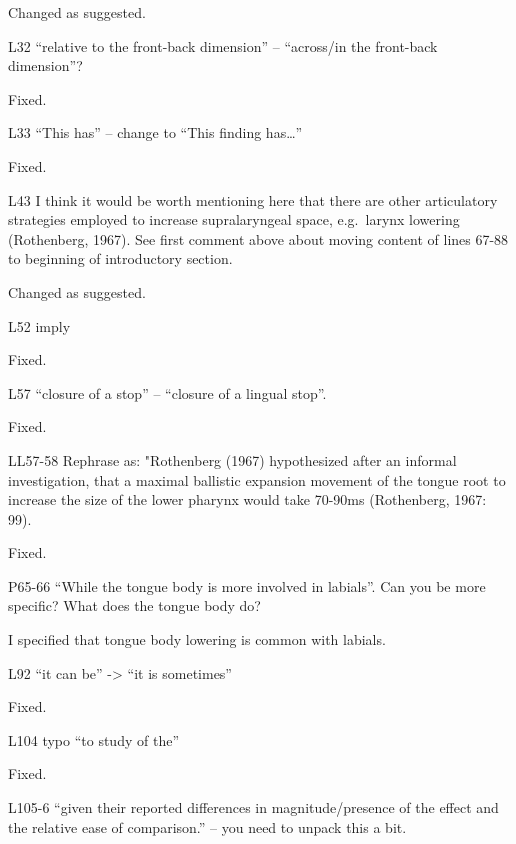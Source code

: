 \documentclass[]{article}
\begin{document}
Changed as suggested. \color{black}

L32 ``relative to the front-back dimension'' -- ``across/in the
front-back dimension''?

\color{plum}

Fixed. \color{black}

L33 ``This has'' -- change to ``This finding has\ldots{}''

\color{plum}

Fixed. \color{black}

L43 I think it would be worth mentioning here that there are other
articulatory strategies employed to increase supralaryngeal space,
e.g.~larynx lowering (Rothenberg, 1967). See first comment above about
moving content of lines 67-88 to beginning of introductory section.

\color{plum}

Changed as suggested. \color{black}

L52 imply

\color{plum}

Fixed. \color{black}

L57 ``closure of a stop'' -- ``closure of a lingual stop''.

\color{plum}

Fixed. \color{black}

LL57-58 Rephrase as: "Rothenberg (1967) hypothesized after an informal
investigation, that a maximal ballistic expansion movement of the tongue
root to increase the size of the lower pharynx would take 70-90ms
(Rothenberg, 1967: 99).

\color{plum}

Fixed. \color{black}

P65-66 ``While the tongue body is more involved in labials''. Can you be
more specific? What does the tongue body do?

\color{plum}

I specified that tongue body lowering is common with labials.
\color{black}

L92 ``it can be'' -\textgreater{} ``it is sometimes''

\color{plum}

Fixed. \color{black}

L104 typo ``to study of the''

\color{plum}

Fixed. \color{black}

L105-6 ``given their reported differences in magnitude/presence of the
effect and the relative ease of comparison.'' -- you need to unpack this
a bit.
\end{document}
